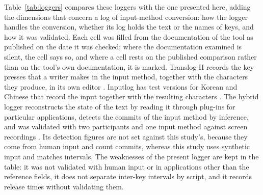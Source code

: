 Table~\ref{tab:loggers} compares these loggers with the one presented here, adding the dimensions that concern a log
of input-method conversion: how the logger handles the conversion, whether its log holds the text or the names of
keys, and how it was validated. Each cell was filled from the documentation of the tool as published on the date it
was checked; where the documentation examined is silent, the cell says so, and where a cell rests on the published
comparison rather than on the tool's own documentation, it is marked. Translog-II records the key presses that a writer
makes in the input method, together with the characters they produce, in its own editor \citep{zou2026,carl2012}.
Inputlog has test versions for Korean and Chinese that record the input together with the resulting characters
\citep{inputlog-web}. The hybrid logger reconstructs the state of the text by reading it through plug-ins for
particular applications, detects the commits of the input method by inference, and was validated with two participants
and one input method against screen recordings \citep{crotti2026}. Its detection figures are not set against this
study's, because they come from human input and count commits, whereas this study uses synthetic input and matches
intervals. The weaknesses of the present logger are kept in the table: it was not validated with human input or in
applications other than the reference fields, it does not separate inter-key intervals by script, and it records
release times without validating them.

